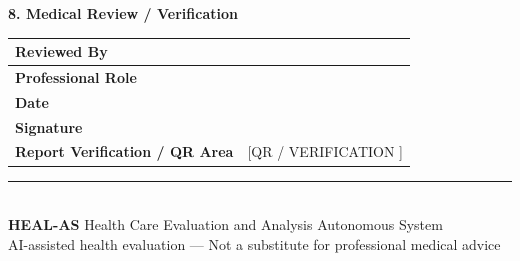 \documentclass[11pt,a4paper]{article}
\newcommand{\sectiontitle}[1]{\vspace{8pt}\noindent\colorbox{HealBlue}{\parbox{\dimexpr\linewidth-2\fboxsep}{\color{white}\textbf{\large #1}}}\vspace{5pt}}
\begin{document}
\sectiontitle{8. Medical Review / Verification}
\begin{tabularx}{\linewidth}{|l|X|}
\hline \textbf{Reviewed By} & \\[8pt] \hline
\textbf{Professional Role} & \\[8pt] \hline
\textbf{Date} & \\[8pt] \hline
\textbf{Signature} & \\[8pt] \hline
\textbf{Report Verification / QR Area} & [\hfill QR / VERIFICATION \hfill] \\[12pt] \hline
\end{tabularx}

\vfill
\begin{center}
\rule{\linewidth}{0.5pt}\\
{\small\textbf{\color{HealBlue}HEAL-AS} \quad Health Care Evaluation and Analysis Autonomous System}\\
{\scriptsize AI-assisted health evaluation — Not a substitute for professional medical advice}
\end{center}
\end{document}
